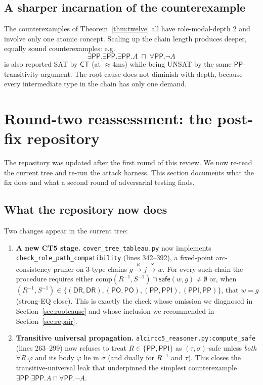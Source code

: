 \documentclass[]{ceurart}
\newcommand{\DR}{\mathsf{DR}}
\newcommand{\PO}{\mathsf{PO}}
\newcommand{\PP}{\mathsf{PP}}
\newcommand{\PPI}{\mathsf{PPI}}
\theoremstyle{definition}
\theoremstyle{remark}
\begin{document}
\subsection{A sharper incarnation of the counterexample}

The counterexamples of Theorem~\ref{thm:twelve} all have
role-modal-depth $2$ and involve only one atomic concept. Scaling up
the chain length produces deeper, equally sound counterexamples: e.g.
\[
  \exists \PP . \exists \PP . \exists \PP . A \;\sqcap\; \forall \PP . \neg A
\]
is also reported SAT by $\mathsf{CT}$ (at $\approx 4 \mathrm{ms}$) while
being UNSAT by the same $\PP$-transitivity argument.  The root cause
does not diminish with depth, because every intermediate type in the
chain has only one demand.

\section{Round-two reassessment: the post-fix repository}
\label{sec:round2}

The repository was updated after the first round of this review. We
now re-read the current tree and re-run the attack harness. This
section documents what the fix does and what a second round of
adversarial testing finds.

\subsection{What the repository now does}

Two changes appear in the current tree:
\begin{enumerate}
  \item \textbf{A new CT5 stage.}
    \verb|cover_tree_tableau.py| now implements
    \verb|check_role_path_compatibility| (lines 342--392), a
    fixed-point arc-consistency pruner on 3-type chains
    $g \xrightarrow{R} j \xrightarrow{S} w$. For every such chain the
    procedure requires either
    $\mathrm{comp}(R^{-1}, S^{-1}) \cap \mathsf{safe}(w, g) \neq \emptyset$
    or, when $(R^{-1}, S^{-1}) \in \{(\DR,\DR), (\PO,\PO),
    (\PP,\PPI), (\PPI,\PP)\}$, that $w = g$ (strong-EQ close).
    This is exactly the check whose omission we diagnosed in
    Section~\ref{sec:rootcause} and whose inclusion we recommended in
    Section~\ref{sec:repair}.
  \item \textbf{Transitive universal propagation.}
    \verb|alcircc5_reasoner.py:|\texttt{compute\_safe} (lines
    263--299) now refuses to treat $R \in \{\PP, \PPI\}$ as
    $(\tau,\sigma)$-safe unless \emph{both} $\forall R.\varphi$ and
    its body $\varphi$ lie in $\sigma$ (and dually for $R^{-1}$ and
    $\tau$). This closes the transitive-universal leak that
    underpinned the simplest counterexample
    $\exists \PP . \exists \PP . A \sqcap \forall \PP . \neg A$.
\end{enumerate}
\end{document}

